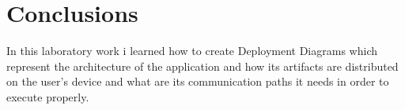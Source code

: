 \section*{Conclusions}
In this laboratory work i learned how to create Deployment Diagrams which represent the architecture of the application and how its artifacts are distributed on the user's device and what are its communication paths it needs in order to execute properly.
\clearpage